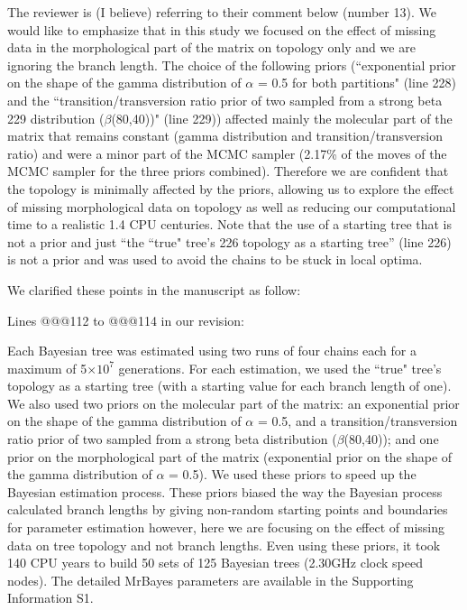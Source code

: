 \documentclass[11pt]{letter}
\begin{document}
\begin{letter}{}
The reviewer is (I believe) referring to their comment below (number 13). We would like to emphasize that in this study we focused on the effect of missing data in the morphological part of the matrix on topology only and we are ignoring the branch length. The choice of the following priors (``exponential prior on the shape of the gamma distribution of $\alpha$ = 0.5 for both partitions" (line 228) and the ``transition/transversion ratio prior of two sampled from a strong beta 229 distribution ($\beta$(80,40))" (line 229)) affected mainly the molecular part of the matrix that remains constant (gamma distribution and transition/transversion ratio) and were a minor part of the MCMC sampler (2.17\% of the moves of the MCMC sampler for the three priors combined). Therefore we are confident that the topology is minimally affected by the priors, allowing us to explore the effect of missing morphological data on topology as well as reducing our computational time to a realistic 1.4 CPU centuries. Note that the use of a starting tree that is not a prior and just ``the ``true" tree's 226 topology as a starting tree'' (line 226) is not a prior and was used to avoid the chains to be stuck in local optima.

We clarified these points in the manuscript as follow:

Lines @@@112 to @@@114 in our revision:

\hfill\begin{minipage}{\dimexpr\textwidth-1cm}
Each Bayesian tree was estimated using two runs of four chains each for a maximum of 5$\times$$10^7$ generations. For each estimation, we used the ``true" tree's topology as a starting tree (with a starting value for each branch length of one). We also used two priors on the molecular part of the matrix: an exponential prior on the shape of the gamma distribution of $\alpha$ = 0.5, and a transition/transversion ratio prior of two sampled from a strong beta distribution ($\beta$(80,40)); and one prior on the morphological part of the matrix (exponential prior on the shape of the gamma distribution of $\alpha$ = 0.5). We used these priors to speed up the Bayesian estimation process. These priors biased the way the Bayesian process calculated branch lengths by giving non-random starting points and boundaries for parameter estimation however, here we are focusing on the effect of missing data on tree topology and not branch lengths. Even using these priors, it took $~$ 140 CPU years to build 50 sets of 125 Bayesian trees (2.30GHz clock speed nodes). The detailed MrBayes parameters are available in the Supporting Information S1.
\end{minipage}


\end{letter}
\end{document}
